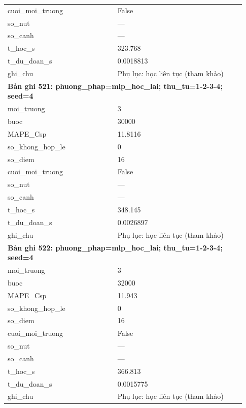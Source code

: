 \begin{longtable}{p{0.43\linewidth}p{0.50\linewidth}}
cuoi\_\allowbreak moi\_\allowbreak truong & False \\
so\_\allowbreak nut & — \\
so\_\allowbreak canh & — \\
t\_\allowbreak hoc\_\allowbreak s & 323.768 \\
t\_\allowbreak du\_\allowbreak doan\_\allowbreak s & 0.0018813 \\
ghi\_\allowbreak chu & Phụ lục: học liên tục (tham khảo) \\
\midrule
\multicolumn{2}{p{0.95\linewidth}}{\textbf{Bản ghi 521: phuong\_phap=mlp\_hoc\_lai; thu\_tu=1-2-3-4; seed=4}} \\
moi\_\allowbreak truong & 3 \\
buoc & 30000 \\
MAPE\_\allowbreak Csp & 11.8116 \\
so\_\allowbreak khong\_\allowbreak hop\_\allowbreak le & 0 \\
so\_\allowbreak diem & 16 \\
cuoi\_\allowbreak moi\_\allowbreak truong & False \\
so\_\allowbreak nut & — \\
so\_\allowbreak canh & — \\
t\_\allowbreak hoc\_\allowbreak s & 348.145 \\
t\_\allowbreak du\_\allowbreak doan\_\allowbreak s & 0.0026897 \\
ghi\_\allowbreak chu & Phụ lục: học liên tục (tham khảo) \\
\midrule
\multicolumn{2}{p{0.95\linewidth}}{\textbf{Bản ghi 522: phuong\_phap=mlp\_hoc\_lai; thu\_tu=1-2-3-4; seed=4}} \\
moi\_\allowbreak truong & 3 \\
buoc & 32000 \\
MAPE\_\allowbreak Csp & 11.943 \\
so\_\allowbreak khong\_\allowbreak hop\_\allowbreak le & 0 \\
so\_\allowbreak diem & 16 \\
cuoi\_\allowbreak moi\_\allowbreak truong & False \\
so\_\allowbreak nut & — \\
so\_\allowbreak canh & — \\
t\_\allowbreak hoc\_\allowbreak s & 366.813 \\
t\_\allowbreak du\_\allowbreak doan\_\allowbreak s & 0.0015775 \\
ghi\_\allowbreak chu & Phụ lục: học liên tục (tham khảo) \\

\end{longtable}
